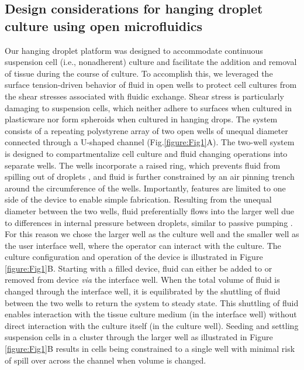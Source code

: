 \subsection{Design considerations for hanging droplet culture using open microfluidics}
Our hanging droplet platform was designed to accommodate continuous suspension cell (i.e., nonadherent) culture and facilitate the addition and removal of tissue during the course of culture. To accomplish this, we leveraged the surface tension-driven behavior of fluid in open wells to protect cell cultures from the shear stresses associated with fluidic exchange. Shear stress is particularly damaging to suspension cells, which neither adhere to surfaces when cultured in plasticware nor form spheroids when cultured in hanging drops. 
The system consists of a repeating polystyrene array of two open wells of unequal diameter connected through a U-shaped channel (Fig.\ref{figure:Fig1}A). The two-well system is designed to compartmentalize cell culture and fluid changing operations into separate wells. The wells incorporate a raised ring, which prevents fluid from spilling out of droplets \cite{Hsiao2012a}, and fluid is further constrained by an air pinning trench around the circumference of the wells. Importantly, features are limited to one side of the device to enable simple fabrication. 
Resulting from the unequal diameter between the two wells, fluid preferentially flows into the larger well due to differences in internal pressure between droplets, similar to passive pumping \cite{Walker2002}. For this reason we chose the larger well as the culture well and the smaller well as the user interface well, where the operator can interact with the culture. The culture configuration and operation of the device is illustrated in Figure \ref{figure:Fig1}B. Starting with a filled device, fluid can either be added to or removed from device \textit{via} the interface well. When the total volume of fluid is changed through the interface well, it is equilibrated by the shuttling of fluid between the two wells to return the system to steady state. This shuttling of fluid enables interaction with the tissue culture medium (in the interface well) without direct interaction with the culture itself (in the culture well). Seeding and settling suspension cells in a cluster through the larger well as illustrated in Figure \ref{figure:Fig1}B results in cells being constrained to a single well with minimal risk of spill over across the channel when volume is changed.
